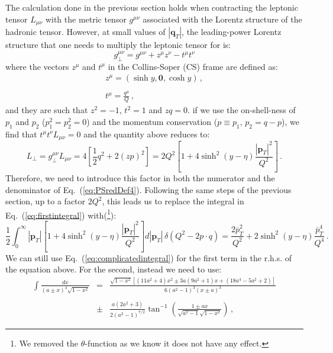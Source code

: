 \documentclass[10pt,a4paper]{article}
\begin{document}
The calculation done in the previous section holds when contracting
the leptonic tensor $L_{\mu\nu}$ with the metric tensor $g^{\mu\nu}$
associated with the Lorentz structure of the hadronic tensor. However,
at small values of $|\mathbf{q}_T|$, the leading-power Lorentz
structure that one needs to multiply the leptonic tensor for is:
\begin{equation}
g_\perp^{\mu\nu} = g^{\mu\nu}+z^\mu z^\nu-t^\mu t^\nu
\end{equation}
where the vectors $z^\mu$ and $t^\mu$ in the Collins-Soper (CS) frame
are defined as:
\begin{equation}\label{eq:auxvects}
\begin{array}{l}
\displaystyle z^\mu = (\sinh y,\mathbf{0},\cosh y)\,,\\
\\
\displaystyle t^\mu = \frac{q^\mu}{Q}\,,
\end{array}
\end{equation}
and they are such that $z^2=-1$, $t^2=1$ and $zq = 0$. if we use the
on-shell-ness of $p_1$ and $p_2$ ($p_1^2=p_2^2=0$) and the momentum
conservation ($p\equiv p_1$, $p_2=q-p$), we find that
$t^\mu t^\nu L_{\mu\nu}=0$ and the quantity above reduces to:
\begin{equation}\label{eq:LT}
  L_\perp = g_\perp^{\mu\nu}L_{\mu\nu} = 4\left[\frac12q^2 + 2(zp)^2\right] = 2Q^2\left[1+4 \sinh^2(y-\eta)\frac{|\mathbf{p}_T|^2}{Q^2}\right]\,.
\end{equation}
Therefore, we need to introduce this factor in both the numerator and
the denominator of Eq.~(\ref{eq:PSredDef4}). Following the same steps
of the previous section, up to a factor $2Q^2$, this leads us to
replace the integral in Eq.~(\ref{eq:firstintegral}) with(\footnote{We
  removed the $\theta$-function as we know it does not have any
  effect.}):
\begin{equation}\label{eq:firstintegralNew}
  \frac12 \int_0^\infty|\mathbf{p}_T|\left[1+4\sinh^2(y-\eta)
  \frac{|\mathbf{p}_T|^2}{Q^2}\right]d|\mathbf{p}_T|\,\delta(Q^2-2p\cdot
  q) =\frac{2\overline{p}_T^2}{Q^2}+
  2\sinh^2(y-\eta)\frac{\overline{p}_T^4} {Q^4}\,.
\end{equation}
We can still use Eq.~(\ref{eq:complicatedintegral}) for the first term
in the r.h.s. of the equation above. For the second, instead we need
to use:
\begin{equation}\label{eq:complicatedintegral2}
\begin{array}{rcl}
\displaystyle\int \frac{dx}{(a\pm
  x)^4\sqrt{1-x^2}}&=&\displaystyle\frac{\sqrt{1-x^2}\left[(11a^2+4)x^2\pm
                       3 a(9a^2+1)x + (18a^4-5a^2+2)\right]}{6(a^2-1)^3(x\pm
  a)^3}\\
\\
&\pm&\displaystyle\frac{a(2a^2+3)}{2(a^2-1)^{7/2}}\tan^{-1}\left(\frac{1\pm
      ax}{\sqrt{a^2-1}\sqrt{1-x^2}}\right)\,,
\end{array}
\end{equation}
\end{document}
